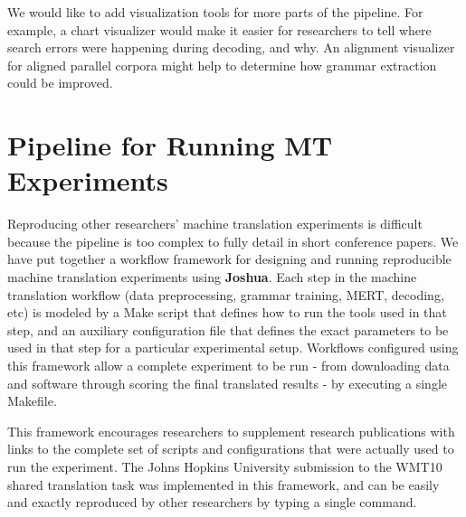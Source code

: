 \documentclass[11pt]{article}
\newcommand{\joshua}{\textbf{Joshua}\xspace}
\begin{document}
We would like to add visualization tools for more parts of the pipeline. For
example, a chart visualizer would make it easier for researchers to tell where
search errors were happening during decoding, and why. An alignment visualizer
for aligned parallel corpora might help to determine how grammar extraction 
could be improved.


\section{Pipeline for Running MT Experiments}

Reproducing other researchers' machine translation experiments is difficult because the pipeline is too complex to fully detail in short conference papers. We have put together a workflow framework for designing and running reproducible machine translation experiments using \joshua {}. Each step in the machine translation workflow (data preprocessing, grammar training, MERT, decoding, etc) is modeled by a Make script that defines how to run the tools used in that step, and an auxiliary configuration file that defines the exact parameters to be used in that step for a particular experimental setup. Workflows configured using this framework allow a complete experiment to be run - from downloading data and software through scoring the final translated results - by executing a single Makefile.

This framework encourages researchers to supplement research publications with links to the complete set of scripts and configurations that were actually used to run the experiment. The Johns Hopkins University submission to the WMT10 shared translation task was implemented in this framework, and can be easily and exactly reproduced by other researchers by typing a single command. 


\end{document}
